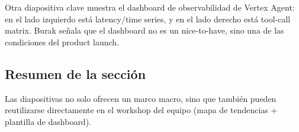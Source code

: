 Otra diapositiva clave muestra el dashboard de observabilidad de Vertex Agent: en el lado izquierdo está latency/time series, y en el lado derecho está tool-call matrix. Burak señala que el dashboard no es un nice-to-have, sino una de las condiciones del product launch.

\subsection{Resumen de la sección}

Las diapositivas no solo ofrecen un marco macro, sino que también pueden reutilizarse directamente en el workshop del equipo (mapa de tendencias + plantilla de dashboard).

